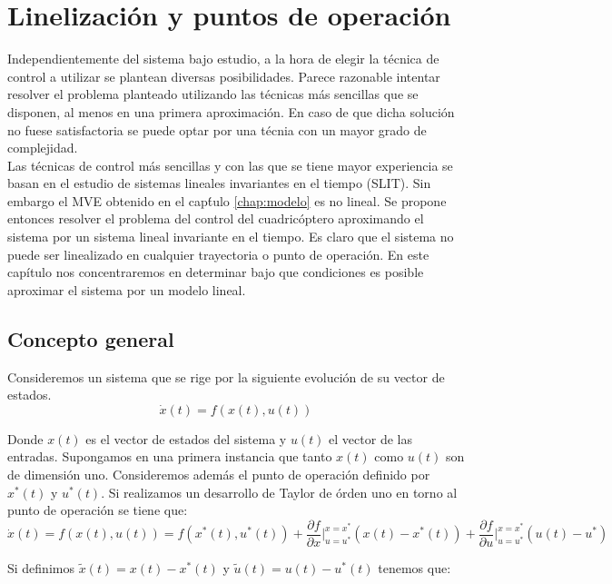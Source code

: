\documentclass[main]{subfiles}
\begin{document}
\chapter{Linelizaci\'on y puntos de operaci\'on}
\label{chap:linealizacion}

Independientemente del sistema bajo estudio, a la hora de elegir la t\'ecnica de control a utilizar se plantean diversas posibilidades. Parece razonable intentar resolver el problema planteado utilizando las t\'ecnicas m\'as sencillas que se disponen, al menos en una primera aproximaci\'on. En caso de que dicha soluci\'on no fuese satisfactoria se puede optar por una t\'ecnia con un mayor grado de complejidad.\\ 

Las t\'ecnicas de control m\'as sencillas y con las que se tiene mayor experiencia se basan en el estudio de sistemas lineales invariantes en el tiempo (SLIT). Sin embargo el MVE obtenido en el cap\'tulo \ref{chap:modelo} es no lineal. Se propone entonces resolver el problema del control del cuadric\'optero aproximando el sistema por un sistema lineal invariante en el tiempo. Es claro que el sistema no puede ser linealizado en cualquier trayectoria o punto de operaci\'on. En  este cap\'itulo nos concentraremos en determinar bajo que condiciones es posible aproximar el sistema por un modelo lineal.

\section{Concepto general}
Consideremos un sistema que se rige por la siguiente evoluci\'on de su vector de estados. 
\begin{equation}
\dot{x}(t)=f(x(t),u(t))
\end{equation}

Donde $x(t)$ es el vector de estados del sistema y $u(t)$ el vector de las entradas. Supongamos en una primera instancia que tanto $x(t)$ como $u(t)$ son de dimensi\'on uno. Consideremos adem\'as el punto de operaci\'on definido por $x^*(t)$ y $u^*(t)$. Si realizamos un desarrollo de Taylor de \'orden uno en torno al punto de operaci\'on se tiene que:
\begin{equation}
\dot{x}(t)=f(x(t),u(t))=f(x^*(t),u^*(t))+\frac{\partial f}{\partial x}\vert_{u=u^*}^{x=x^*}(x(t)-x^*(t))+\frac{\partial f}{\partial u}\vert_{u=u^*}^{x=x^*}(u(t)-u^*)
\end{equation}

Si definimos $\tilde{x}(t)=x(t)-x^*(t)$ y $\tilde{u}(t)=u(t)-u^*(t)$ tenemos que:
\end{document}
